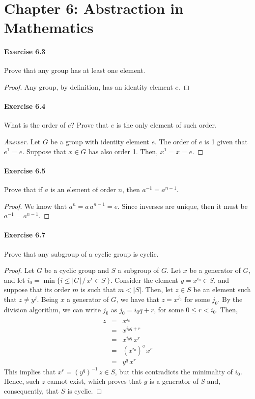\section*{Chapter 6: Abstraction in Mathematics}

\paragraph{Exercise 6.3}
Prove that any group has at least one element.

\begin{proof}
Any group, by definition, has an identity element $e$.
\end{proof}


\paragraph{Exercise 6.4}
What is the order of $e$? Prove that $e$ is the only element of such order.

\begin{proof}[Answer]
Let $G$ be a group with identity element $e$. The order of $e$ is 1 given that
$e^1 = e$. Suppose that $x \in G$ has also order 1. Then, $x^1 = x = e$.
\end{proof}


\paragraph{Exercise 6.5}
Prove that if $a$ is an element of order $n$, then $a^{-1} = a^{n-1}$.

\begin{proof}
We know that $a^n = a \, a^{n-1} = e$. Since inverses are unique, then
it must be $a^{-1} = a^{n-1}$.
\end{proof}


\paragraph{Exercise 6.7}
Prove that any subgroup of a cyclic group is cyclic.

\begin{proof}
Let $G$ be a cyclic group and $S$ a subgroup of $G$. Let $x$
be a generator of $G$, and let
$i_0 = \min{\{ i \leq |G| \, / \, x^i \in S \ \}}$.
Consider the element $y = x^{i_0} \in S$, and suppose that its order
$m$ is such that $m < |S|$. Then, let $z \in S$ be an element such that
$z \neq y^j$. Being $x$ a generator of $G$, we have that $z = x^{j_0}$
for some $j_0$. By the division algorithm, we can write $j_0$ as
$j_0 = i_0 q + r$, for some $0 \leq r < i_0$. Then,
\begin{eqnarray*}
z &=& x^{j_0} \\
  &=& x^{i_0 q + r} \\ 
  &=& x^{i_0 q} \, x^r \\
  &=& (x^{i_0})^q \, x^r \\
  &=& y^q \, x^r
\end{eqnarray*}
This implies that $x^r = (y^q)^{-1} \, z \in S$, but this contradicts
the minimality of $i_0$. Hence, such $z$ cannot exist, which proves that
$y$ is a generator of $S$ and, consequently, that $S$ is cyclic. 
\end{proof}


